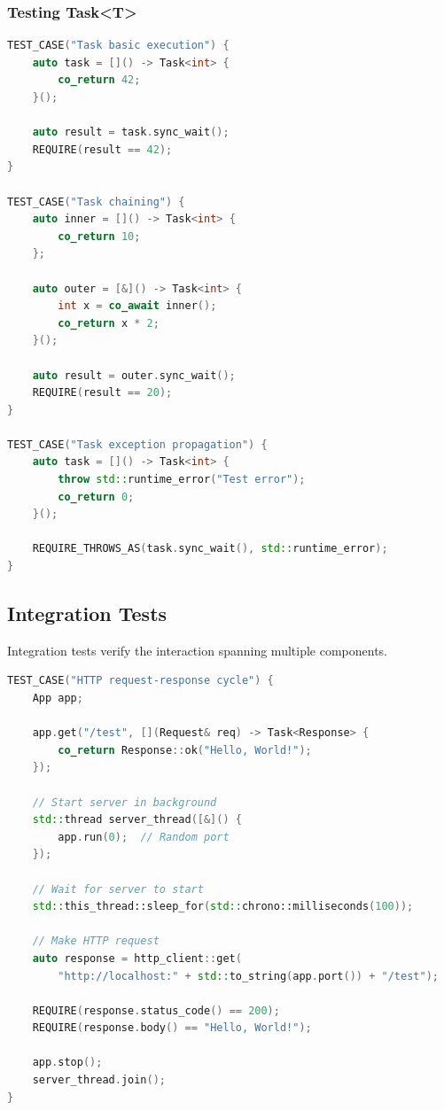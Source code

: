 \subsubsection{Testing Task<T>}

\begin{lstlisting}[language=C++, basicstyle=\small\ttfamily, caption={Task coroutine tests}]
TEST_CASE("Task basic execution") {
    auto task = []() -> Task<int> {
        co_return 42;
    }();
    
    auto result = task.sync_wait();
    REQUIRE(result == 42);
}

TEST_CASE("Task chaining") {
    auto inner = []() -> Task<int> {
        co_return 10;
    };
    
    auto outer = [&]() -> Task<int> {
        int x = co_await inner();
        co_return x * 2;
    }();
    
    auto result = outer.sync_wait();
    REQUIRE(result == 20);
}

TEST_CASE("Task exception propagation") {
    auto task = []() -> Task<int> {
        throw std::runtime_error("Test error");
        co_return 0;
    }();
    
    REQUIRE_THROWS_AS(task.sync_wait(), std::runtime_error);
}
\end{lstlisting}

\subsection{Integration Tests}

Integration tests verify the interaction spanning multiple components.

\begin{lstlisting}[language=C++, basicstyle=\small\ttfamily, caption={HTTP integration test}]
TEST_CASE("HTTP request-response cycle") {
    App app;
    
    app.get("/test", [](Request& req) -> Task<Response> {
        co_return Response::ok("Hello, World!");
    });
    
    // Start server in background
    std::thread server_thread([&]() {
        app.run(0);  // Random port
    });
    
    // Wait for server to start
    std::this_thread::sleep_for(std::chrono::milliseconds(100));
    
    // Make HTTP request
    auto response = http_client::get(
        "http://localhost:" + std::to_string(app.port()) + "/test");
    
    REQUIRE(response.status_code() == 200);
    REQUIRE(response.body() == "Hello, World!");
    
    app.stop();
    server_thread.join();
}
\end{lstlisting}

